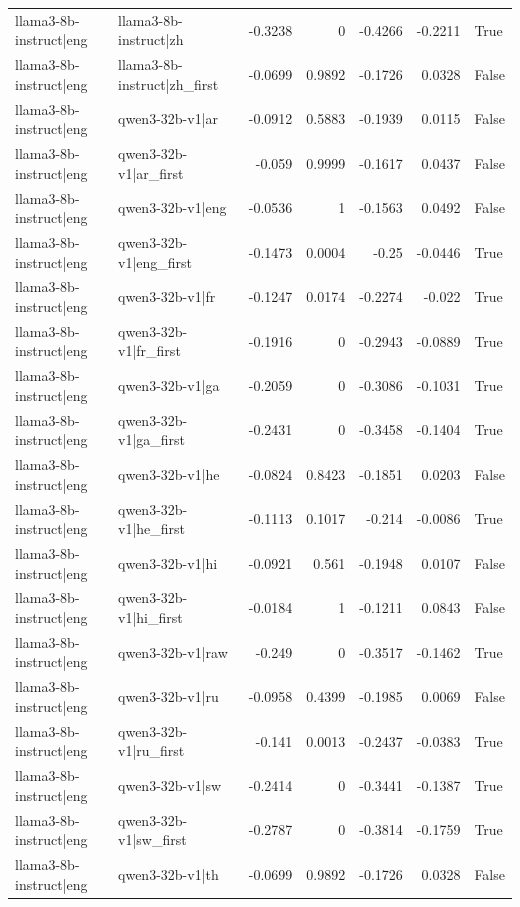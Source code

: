 \begin{table}
\begin{tabular}{l l r r r r l}
llama3-8b-instruct|eng & llama3-8b-instruct|zh & -0.3238 & 0 & -0.4266 & -0.2211 & True \\
llama3-8b-instruct|eng & llama3-8b-instruct|zh_first & -0.0699 & 0.9892 & -0.1726 & 0.0328 & False \\
llama3-8b-instruct|eng & qwen3-32b-v1|ar & -0.0912 & 0.5883 & -0.1939 & 0.0115 & False \\
llama3-8b-instruct|eng & qwen3-32b-v1|ar_first & -0.059 & 0.9999 & -0.1617 & 0.0437 & False \\
llama3-8b-instruct|eng & qwen3-32b-v1|eng & -0.0536 & 1 & -0.1563 & 0.0492 & False \\
llama3-8b-instruct|eng & qwen3-32b-v1|eng_first & -0.1473 & 0.0004 & -0.25 & -0.0446 & True \\
llama3-8b-instruct|eng & qwen3-32b-v1|fr & -0.1247 & 0.0174 & -0.2274 & -0.022 & True \\
llama3-8b-instruct|eng & qwen3-32b-v1|fr_first & -0.1916 & 0 & -0.2943 & -0.0889 & True \\
llama3-8b-instruct|eng & qwen3-32b-v1|ga & -0.2059 & 0 & -0.3086 & -0.1031 & True \\
llama3-8b-instruct|eng & qwen3-32b-v1|ga_first & -0.2431 & 0 & -0.3458 & -0.1404 & True \\
llama3-8b-instruct|eng & qwen3-32b-v1|he & -0.0824 & 0.8423 & -0.1851 & 0.0203 & False \\
llama3-8b-instruct|eng & qwen3-32b-v1|he_first & -0.1113 & 0.1017 & -0.214 & -0.0086 & True \\
llama3-8b-instruct|eng & qwen3-32b-v1|hi & -0.0921 & 0.561 & -0.1948 & 0.0107 & False \\
llama3-8b-instruct|eng & qwen3-32b-v1|hi_first & -0.0184 & 1 & -0.1211 & 0.0843 & False \\
llama3-8b-instruct|eng & qwen3-32b-v1|raw & -0.249 & 0 & -0.3517 & -0.1462 & True \\
llama3-8b-instruct|eng & qwen3-32b-v1|ru & -0.0958 & 0.4399 & -0.1985 & 0.0069 & False \\
llama3-8b-instruct|eng & qwen3-32b-v1|ru_first & -0.141 & 0.0013 & -0.2437 & -0.0383 & True \\
llama3-8b-instruct|eng & qwen3-32b-v1|sw & -0.2414 & 0 & -0.3441 & -0.1387 & True \\
llama3-8b-instruct|eng & qwen3-32b-v1|sw_first & -0.2787 & 0 & -0.3814 & -0.1759 & True \\
llama3-8b-instruct|eng & qwen3-32b-v1|th & -0.0699 & 0.9892 & -0.1726 & 0.0328 & False \\

\end{tabular}
\end{table}
